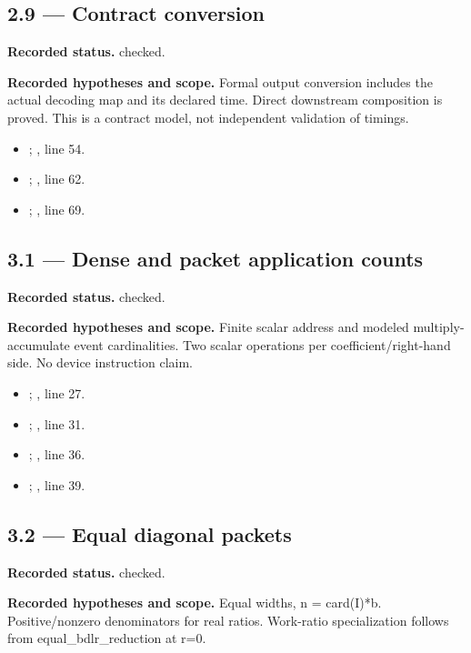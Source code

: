 \subsection{2.9 — Contract conversion}
\label{result:2.9}
\textbf{Recorded status.} checked.

\textbf{Recorded hypotheses and scope.} Formal output conversion includes the actual decoding map and its declared time. Direct downstream composition is proved. This is a contract model, not independent validation of timings.

\begin{itemize}
\item {}; , line 54.
\item {}; , line 62.
\item {}; , line 69.
\end{itemize}
\subsection{3.1 — Dense and packet application counts}
\label{result:3.1}
\textbf{Recorded status.} checked.

\textbf{Recorded hypotheses and scope.} Finite scalar address and modeled multiply-accumulate event cardinalities. Two scalar operations per coefficient/right-hand side. No device instruction claim.

\begin{itemize}
\item {}; , line 27.
\item {}; , line 31.
\item {}; , line 36.
\item {}; , line 39.
\end{itemize}
\subsection{3.2 — Equal diagonal packets}
\label{result:3.2}
\textbf{Recorded status.} checked.

\textbf{Recorded hypotheses and scope.} Equal widths, n = card(I)*b. Positive/nonzero denominators for real ratios. Work-ratio specialization follows from equal\_bdlr\_reduction at r=0.

